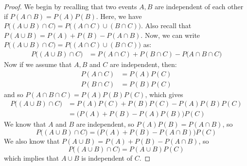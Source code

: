 \documentclass{article}
\begin{document}
	\begin{proof}
		We begin by recalling that two events $A, B$ are independent of each other if $P(A\cap B) = P(A)P(B)$. Here, we have $P\big( (A \cup B) \cap C \big) = P\big( (A \cap C) \cup (B \cap C)\big)$. Also recall that $P(A \cup B) = P(A)+P(B)-P(A \cap B)$. Now, we can write $P\big( (A \cup B) \cap C \big) = P\big( (A\cap C) \cup (B \cap C)  \big)$ as:
		\begin{align*}
			P\big( (A \cup B) \cap C \big) &= P(A \cap C) + P(B \cap C)- P\big(A \cap B \cap C\big)
		\end{align*}
		Now if we assume that $A, B$ and $C$ are independent, then:
		\begin{align*}
			P(A \cap C) &= P(A) P(C) \\
			P(B \cap C) &= P(B) P(C)
		\end{align*}
		and so $P(A \cap B \cap C) = P(A)P(B)P(C)$, which gives
		\begin{align*}
			P\big( (A \cup B) \cap C \big) &= P(A)P(C) + P(B)P(C) - P(A)P(B)P(C) \\
			&= \big( P(A)+P(B)-P(A)P(B)\big)P(C)
		\end{align*}
		We know that $A$ and $B$ are independent, so $P(A)P(B)=P(A\cap B)$, so
		$$ P\big( (A \cup B) \cap C \big) = \big( P(A)+P(B)-P(A\cap B)\big)P(C)$$
		We also know that $P(A\cup B) = P(A) + P(B) - P(A \cap B)$, so
		$$ P\big( (A \cup B) \cap C \big) = P(A \cup B) P(C)$$ which implies that $A \cup B$ is independent of $C$.
		
	\end{proof}
\end{document}
